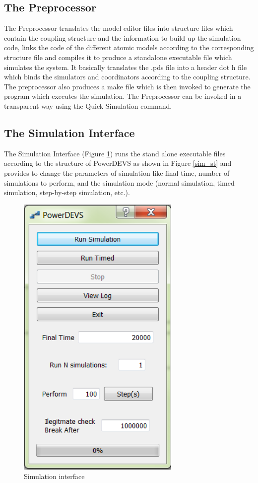\documentclass[titlepage]{report}%
\begin{document}
\subsection{The Preprocessor}
The Preprocessor translates the model editor files into structure files which contain the coupling structure and the information to build up the simulation code, links the code of the different atomic models according to the corresponding structure file and compiles it to produce a standalone executable file which simulates the system. It basically translates the .pds file into a header dot h file which binds the simulators and coordinators according to the coupling structure. The preprocessor also produces a make file which is then invoked to generate the program which executes the simulation. The Preprocessor can be invoked in a transparent way using the Quick Simulation command.

\subsection{The Simulation Interface }
The Simulation Interface (Figure \ref{sim_int}) runs the stand alone executable files according to the structure of PowerDEVS as shown in Figure \ref{sim_st} and provides to change the parameters of simulation like final time, number of simulations to perform, and the simulation mode (normal simulation, timed simulation, step-by-step simulation, etc.).

\begin{figure}[ht!]
  \centering
    \includegraphics[width=0.7\textwidth]{Fig8.png}
    \caption{Simulation interface}
    \label{sim_int}
\end{figure}
\end{document}
